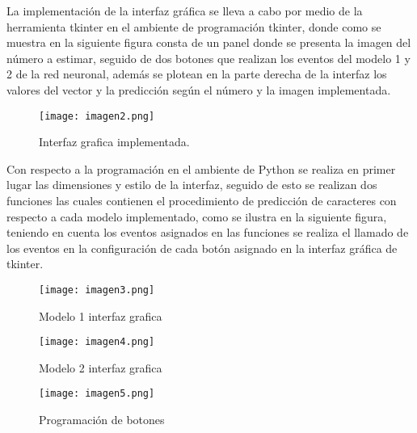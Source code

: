 \documentclass[journal]{IEEEtran}
\begin{document}
La implementación de la interfaz gráfica se lleva a cabo por medio de la herramienta tkinter en el ambiente de programación tkinter, donde como se muestra en la siguiente figura consta de un panel donde se presenta la imagen del número a estimar, seguido de dos botones que realizan los eventos del modelo 1 y 2 de la red neuronal, además se plotean en la parte derecha de la interfaz los valores del vector y la predicción según el número y la imagen implementada.\\
 \begin{figure} [H]
    \centering
    \texttt{[image: imagen2.png]}
    \caption{Interfaz grafica implementada.}
    \label{h}
\end{figure}
Con respecto a la programación en el ambiente de Python se realiza en primer lugar las dimensiones y estilo de la interfaz, seguido de esto se realizan dos funciones las cuales contienen el procedimiento de predicción de caracteres con respecto a cada modelo implementado, como se ilustra en la siguiente figura, teniendo en cuenta los eventos asignados en las funciones se realiza el llamado de los eventos en la configuración de cada botón asignado en la interfaz gráfica de tkinter.\\
 \begin{figure} [H]
    \centering
    \texttt{[image: imagen3.png]}
    \caption{Modelo 1 interfaz grafica}
    \label{h}
\end{figure}
 \begin{figure} [H]
    \centering
    \texttt{[image: imagen4.png]}
    \caption{Modelo 2 interfaz grafica}
    \label{h}
\end{figure}
 \begin{figure} [H]
    \centering
    \texttt{[image: imagen5.png]}
    \caption{Programación de botones}
    \label{h}
\end{figure}
\end{document}
